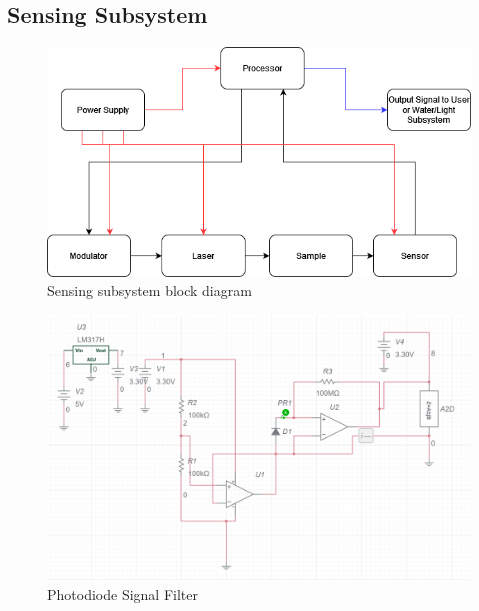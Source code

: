 \subsection{Sensing Subsystem}
\begin{figure}[H]
    \caption{Sensing subsystem block diagram}
    \centering
    \includegraphics[width=\textwidth]{images/IRSensorBlockDiagram.png}
\end{figure}

\begin{figure}[H]
    \caption{Photodiode Signal Filter}
    \centering
    \includegraphics[width=\textwidth]{images/ElectricalSignalFilteringSD1.png}
\end{figure}
